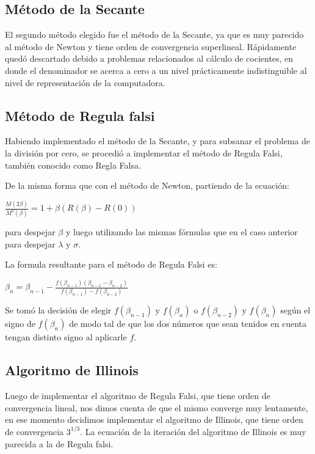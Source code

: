 \subsection{M\'etodo de la Secante}

El segundo m\'etodo elegido fue el m\'etodo de la Secante, ya que es muy parecido al m\'etodo de Newton y tiene orden de convergencia superlineal. R\'apidamente qued\'o descartado debido a problemas relacionados al c\'alculo de cocientes, en donde el denominador se acerca a cero a un nivel pr\'acticamente indistinguible al nivel de representaci\'on de la computadora.

\subsection{M\'etodo de Regula falsi}

Habiendo implementado el m\'etodo de la Secante, y para subsanar el problema de la divisi\'on por cero, se procedi\'o a implementar el m\'etodo de Regula Falsi, tambi\'en conocido como Regla Falsa.

De la misma forma que con el m\'etodo de Newton, partiendo de la ecuaci\'on:

$\frac{M(2\beta)}{M^2(\beta)}=1 + \beta(R(\beta)-R(0))$

para despejar $\beta$ y luego utilizando las mismas f\'ormulas que en el caso anterior para despejar $\lambda$ y $\sigma$.

La formula resultante para el m\'etodo de Regula Falsi es:

$\beta_n = \beta_{n-1} - \frac{f(\beta_{n-1}) (\beta_{n-1}-\beta_{n-2})}{f(\beta_{n-1}) - f(\beta_{n-2})}$

Se tom\'o la decisi\'on de elegir $f(\beta_{n-1})$ y $f(\beta_n)$ o $f(\beta_{n-2})$ y $f(\beta_n)$ seg\'un el signo de $f(\beta_n)$ de modo tal de que los dos n\'umeros que sean tenidos en cuenta tengan distinto signo al aplicarle $f$.

\subsection{Algoritmo de Illinois}

Luego de implementar el algoritmo de Regula Falsi, que tiene orden de convergencia lineal, nos dimos cuenta de que el mismo converge muy lentamente, en ese momento decidimos implementar el algoritmo de Illinois, que tiene orden de convergencia $3^{1/3}$. La ecuación de la iteración del algoritmo de Illinois es muy parecida a la de Regula falsi.

